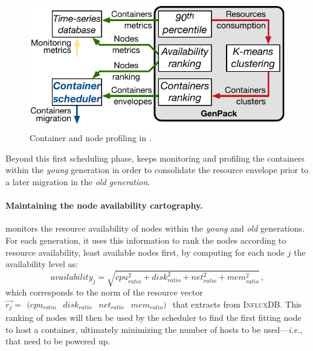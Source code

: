 \begin{figure}[t!]
	\centering
	\includegraphics[width=.7\linewidth]{figures/profiling}
	\caption{Container and node profiling in \GP{}.}
	\label{fig:profiling}
\end{figure}

Beyond this first scheduling phase, \GP keeps monitoring and profiling the containers within the \emph{young} generation in order to consolidate the resource envelope prior to a later migration in the \emph{old generation}.

\paragraph{Maintaining the node availability cartography.}

\GP{} monitors the resource availability of nodes within the \emph{young} and \emph{old} generations.
For each generation, it uses this information to rank the nodes according to resource availability, least available nodes first, by computing for each node $j$ the availability level as:
\small
\[availability_j=\sqrt{cpu_{ratio}^2+disk_{ratio}^2+net_{ratio}^2+mem_{ratio}^2}\,,\]
\normalsize
\noindent which corresponds to the norm of the resource vector
$\vec{r_j}=\begin{matrix}(cpu_{ratio} & disk_{ratio} & net_{ratio} & mem_{ratio})\end{matrix}$
that \GP{} extracts from \textsc{InfluxDB}.
This ranking of nodes will then be used by the scheduler to find the first fitting node to host a container, ultimately minimizing the number of hosts to be used---\emph{i.e.}, that need to be powered up.
